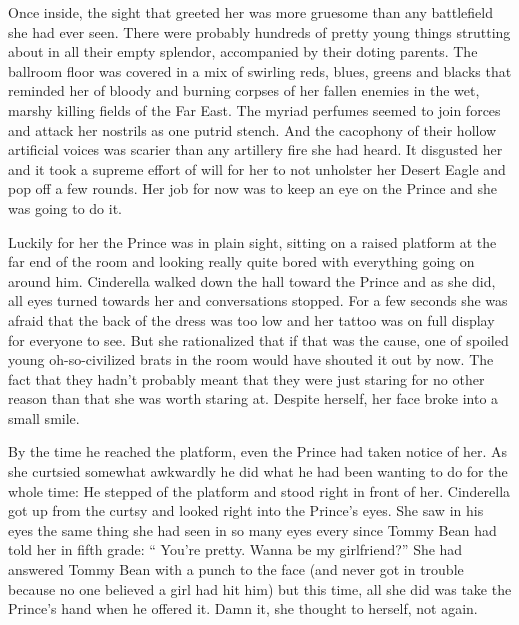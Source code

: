 \documentclass[12pt,letterpaper]{article}
\begin{document}
Once inside, the sight that greeted her was more gruesome than any battlefield she had ever seen. There were probably hundreds of pretty young things strutting about in all their empty splendor, accompanied by their doting parents. The ballroom floor was covered in a mix of swirling reds, blues, greens and blacks that reminded her of bloody and burning corpses of her fallen enemies in the wet, marshy killing fields of the Far East. The myriad perfumes seemed to join forces and attack her nostrils as one putrid stench. And the cacophony of their hollow artificial voices was scarier than any artillery fire she had heard. It disgusted her and it took a supreme effort of will for her to not unholster her Desert Eagle and pop off a few rounds. Her job for now was to keep an eye on the Prince and she was going to do it.

Luckily for her the Prince was in plain sight, sitting on a raised platform at the far end of the room and looking really quite bored with everything going on around him. Cinderella walked down the hall toward the Prince and as she did, all eyes turned towards her and conversations stopped. For a few seconds she was afraid that the back of the dress was too low and her tattoo was on full display for everyone to see. But she rationalized that if that was the cause, one of spoiled young oh-so-civilized brats in the room would have shouted it out by now. The fact that they hadn't probably meant that they were just staring for no other reason than that she was worth staring at. Despite herself, her face broke into a small smile.

By the time he reached the platform, even the Prince had taken notice of her. As she curtsied somewhat awkwardly he did what he had been wanting to do for the whole time: He stepped of the platform and stood right in front of her. Cinderella got up from the curtsy and looked right into the Prince's eyes. She saw in his eyes the same thing she had seen in so many eyes every since Tommy Bean had told her in fifth grade: `` You're pretty. Wanna be my girlfriend?'' She had answered Tommy Bean with a punch to the face (and never got in trouble because no one believed a girl had hit him) but this time, all she did was take the Prince's hand when he offered it. Damn it, she thought to herself, not again.
\end{document}
